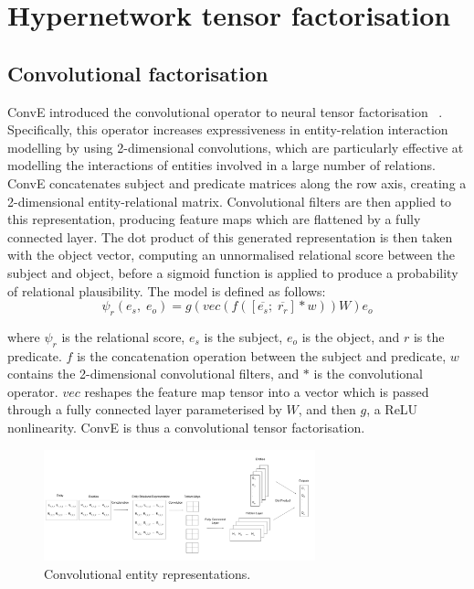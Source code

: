\newpage



\section{Hypernetwork tensor factorisation}

\subsection{Convolutional factorisation}

ConvE introduced the convolutional operator to neural tensor factorisation \unskip ~\citep{dettmers2018convolutional}. Specifically, this operator increases expressiveness in entity-relation interaction modelling by using 2-dimensional convolutions, which are particularly effective at modelling the interactions of entities involved in a large number of relations. ConvE concatenates subject and predicate matrices along the row axis, creating a 2-dimensional entity-relational matrix. Convolutional filters are then applied to this representation, producing feature maps which are flattened by a fully connected layer. The dot product of this generated representation is then taken with the object vector, computing an unnormalised relational score between the subject and object, before a sigmoid function is applied to produce a probability of relational plausibility. The model is defined as follows:
\begin{equation}
	\psi_r(e_s, \; e_o) = g(vec(f(\left [ \overline{e_s}; \; \overline{r_r} \right ]*w))W)e_o
\end{equation}

\noindent where $ \psi_r $ is the relational score, $ e_s $ is the subject, $ e_o $ is the object, and $ r $ is the predicate. $ f $ is the concatenation operation between the subject and predicate, $ w $ contains the 2-dimensional convolutional filters, and $ * $ is the convolutional operator. $ vec $ reshapes the feature map tensor into a vector which is passed through a fully connected layer parameterised by $ W $, and then $ g $, a ReLU nonlinearity. ConvE is thus a convolutional tensor factorisation. 

\begin{figure}[H]
   	\centering
    	\includegraphics[width=0.7\textwidth, height=0.4\textwidth]{convolutional_entity_representations_final}
	\caption{Convolutional entity representations.}
\end{figure}

